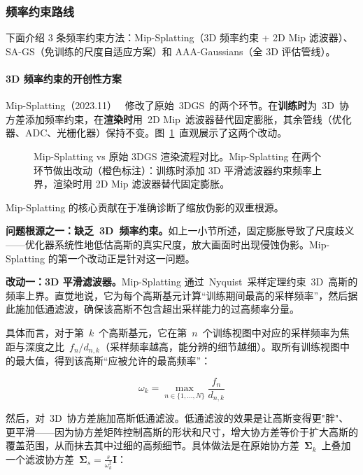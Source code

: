 \subsubsection{频率约束路线}

下面介绍 3 条频率约束方法：Mip-Splatting（3D 频率约束 + 2D Mip 滤波器）、SA-GS（免训练的尺度自适应方案）和 AAA-Gaussians（全 3D 评估管线）。

\paragraph{3D 频率约束的开创性方案}

Mip-Splatting（2023.11）~\cite{2311_16493} 修改了原始~3DGS~的两个环节。在\textbf{训练时}为~3D~协方差添加频率约束，在\textbf{渲染时}用~2D Mip~滤波器替代固定膨胀，其余管线（优化器、ADC、光栅化器）保持不变。图~\ref{fig:02_mipsplatting}~直观展示了这两个改动。

\begin{figure}[htbp]
\centering
\resizebox{0.88\textwidth}{!}{}
\caption{Mip-Splatting vs 原始 3DGS 渲染流程对比。Mip-Splatting 在两个环节做出改动（橙色标注）：训练时添加 3D 平滑滤波器约束频率上界，渲染时用 2D Mip 滤波器替代固定膨胀。}
\label{fig:02_mipsplatting}
\end{figure}

Mip-Splatting 的核心贡献在于准确诊断了缩放伪影的双重根源。

\textbf{问题根源之一：缺乏~3D~频率约束。}如上一小节所述，固定膨胀导致了尺度歧义——优化器系统性地低估高斯的真实尺度，放大画面时出现侵蚀伪影。Mip-Splatting 的第一个改动正是针对这一问题。

\textbf{改动一：3D 平滑滤波器。}Mip-Splatting 通过~Nyquist~采样定理约束~3D~高斯的频率上界。直觉地说，它为每个高斯基元计算“训练期间最高的采样频率”，然后据此施加低通滤波，确保该高斯不包含超出采样能力的过高频率分量。

具体而言，对于第~$k$~个高斯基元，它在第~$n$~个训练视图中对应的采样频率为焦距与深度之比~$f_n/d_{n,k}$（采样频率越高，能分辨的细节越细）。取所有训练视图中的最大值，得到该高斯“应被允许的最高频率”：

\begin{equation}
\omega_k = \max_{n \in \{1,\ldots,N\}} \frac{f_n}{d_{n,k}}
\end{equation}

然后，对~3D~协方差施加高斯低通滤波。低通滤波的效果是让高斯变得更"胖"、更平滑——因为协方差矩阵控制高斯的形状和尺寸，增大协方差等价于扩大高斯的覆盖范围，从而抹去其中过细的高频细节。具体做法是在原始协方差~$\bm{\Sigma}_k$~上叠加一个滤波协方差~$\bm{\Sigma}_s = \frac{s}{\omega_k^2}\mathbf{I}$：

